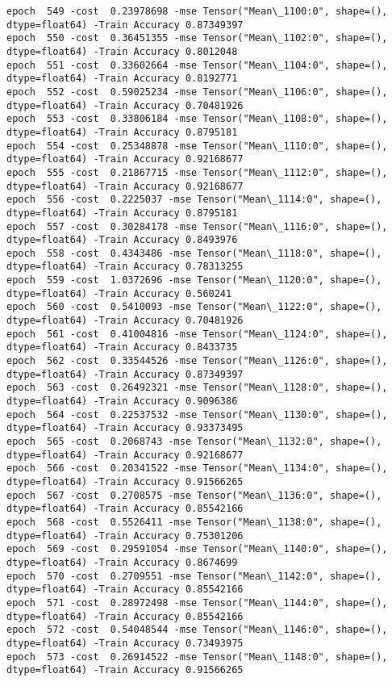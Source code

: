 \documentclass[11pt]{article}
\begin{document}
\begin{Verbatim}[commandchars=\\\{\}]
epoch  549 -cost  0.23978698 -mse Tensor("Mean\_1100:0", shape=(), dtype=float64) -Train Accuracy 0.87349397
epoch  550 -cost  0.36451355 -mse Tensor("Mean\_1102:0", shape=(), dtype=float64) -Train Accuracy 0.8012048
epoch  551 -cost  0.33602664 -mse Tensor("Mean\_1104:0", shape=(), dtype=float64) -Train Accuracy 0.8192771
epoch  552 -cost  0.59025234 -mse Tensor("Mean\_1106:0", shape=(), dtype=float64) -Train Accuracy 0.70481926
epoch  553 -cost  0.33806184 -mse Tensor("Mean\_1108:0", shape=(), dtype=float64) -Train Accuracy 0.8795181
epoch  554 -cost  0.25348878 -mse Tensor("Mean\_1110:0", shape=(), dtype=float64) -Train Accuracy 0.92168677
epoch  555 -cost  0.21867715 -mse Tensor("Mean\_1112:0", shape=(), dtype=float64) -Train Accuracy 0.92168677
epoch  556 -cost  0.2225037 -mse Tensor("Mean\_1114:0", shape=(), dtype=float64) -Train Accuracy 0.8795181
epoch  557 -cost  0.30284178 -mse Tensor("Mean\_1116:0", shape=(), dtype=float64) -Train Accuracy 0.8493976
epoch  558 -cost  0.4343486 -mse Tensor("Mean\_1118:0", shape=(), dtype=float64) -Train Accuracy 0.78313255
epoch  559 -cost  1.0372696 -mse Tensor("Mean\_1120:0", shape=(), dtype=float64) -Train Accuracy 0.560241
epoch  560 -cost  0.5410093 -mse Tensor("Mean\_1122:0", shape=(), dtype=float64) -Train Accuracy 0.70481926
epoch  561 -cost  0.41004816 -mse Tensor("Mean\_1124:0", shape=(), dtype=float64) -Train Accuracy 0.8433735
epoch  562 -cost  0.33544526 -mse Tensor("Mean\_1126:0", shape=(), dtype=float64) -Train Accuracy 0.87349397
epoch  563 -cost  0.26492321 -mse Tensor("Mean\_1128:0", shape=(), dtype=float64) -Train Accuracy 0.9096386
epoch  564 -cost  0.22537532 -mse Tensor("Mean\_1130:0", shape=(), dtype=float64) -Train Accuracy 0.93373495
epoch  565 -cost  0.2068743 -mse Tensor("Mean\_1132:0", shape=(), dtype=float64) -Train Accuracy 0.92168677
epoch  566 -cost  0.20341522 -mse Tensor("Mean\_1134:0", shape=(), dtype=float64) -Train Accuracy 0.91566265
epoch  567 -cost  0.2708575 -mse Tensor("Mean\_1136:0", shape=(), dtype=float64) -Train Accuracy 0.85542166
epoch  568 -cost  0.5526411 -mse Tensor("Mean\_1138:0", shape=(), dtype=float64) -Train Accuracy 0.75301206
epoch  569 -cost  0.29591054 -mse Tensor("Mean\_1140:0", shape=(), dtype=float64) -Train Accuracy 0.8674699
epoch  570 -cost  0.2709551 -mse Tensor("Mean\_1142:0", shape=(), dtype=float64) -Train Accuracy 0.85542166
epoch  571 -cost  0.28972498 -mse Tensor("Mean\_1144:0", shape=(), dtype=float64) -Train Accuracy 0.85542166
epoch  572 -cost  0.54048544 -mse Tensor("Mean\_1146:0", shape=(), dtype=float64) -Train Accuracy 0.73493975
epoch  573 -cost  0.26914522 -mse Tensor("Mean\_1148:0", shape=(), dtype=float64) -Train Accuracy 0.91566265

\end{Verbatim}
\end{document}
